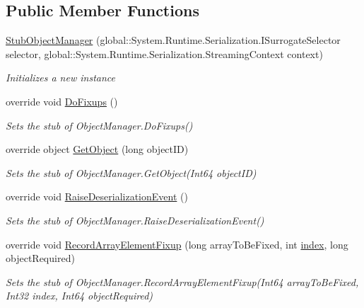 \subsection*{Public Member Functions}
\begin{DoxyCompactItemize}
\item 
\hyperlink{class_system_1_1_runtime_1_1_serialization_1_1_fakes_1_1_stub_object_manager_a721170b01fa374906c2e8b752440f705}{Stub\-Object\-Manager} (global\-::\-System.\-Runtime.\-Serialization.\-I\-Surrogate\-Selector selector, global\-::\-System.\-Runtime.\-Serialization.\-Streaming\-Context context)
\begin{DoxyCompactList}\small\item\em Initializes a new instance\end{DoxyCompactList}\item 
override void \hyperlink{class_system_1_1_runtime_1_1_serialization_1_1_fakes_1_1_stub_object_manager_a528ed5717a6304e25af76af9c248b4a4}{Do\-Fixups} ()
\begin{DoxyCompactList}\small\item\em Sets the stub of Object\-Manager.\-Do\-Fixups()\end{DoxyCompactList}\item 
override object \hyperlink{class_system_1_1_runtime_1_1_serialization_1_1_fakes_1_1_stub_object_manager_a9667aff2a20875ed814a740f8f6c0259}{Get\-Object} (long object\-I\-D)
\begin{DoxyCompactList}\small\item\em Sets the stub of Object\-Manager.\-Get\-Object(\-Int64 object\-I\-D)\end{DoxyCompactList}\item 
override void \hyperlink{class_system_1_1_runtime_1_1_serialization_1_1_fakes_1_1_stub_object_manager_a895be87595287e18f8e5e678393afac8}{Raise\-Deserialization\-Event} ()
\begin{DoxyCompactList}\small\item\em Sets the stub of Object\-Manager.\-Raise\-Deserialization\-Event()\end{DoxyCompactList}\item 
override void \hyperlink{class_system_1_1_runtime_1_1_serialization_1_1_fakes_1_1_stub_object_manager_a77d0ae8d29598117859ed09bb3312689}{Record\-Array\-Element\-Fixup} (long array\-To\-Be\-Fixed, int \hyperlink{jquery-1_810_82-vsdoc_8js_a75bb12d1f23302a9eea93a6d89d0193e}{index}, long object\-Required)
\begin{DoxyCompactList}\small\item\em Sets the stub of Object\-Manager.\-Record\-Array\-Element\-Fixup(\-Int64 array\-To\-Be\-Fixed, Int32 index, Int64 object\-Required)\end{DoxyCompactList}\item 

\end{DoxyCompactItemize}
